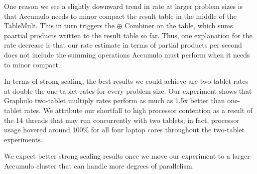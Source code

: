 One reason we see a slightly downward trend in rate at larger problem sizes is that Accumulo
needs to minor compact the result table in the middle of the TableMult. This in turn triggers 
the $\oplus$ Combiner on the table, which sums paartial products written to the result table so far.
Thus, one explanation for the rate decrease is that 
our rate estimate in terms of partial products per second does not include the summing operations
Accumulo must perform when it needs to minor compact.

In terms of strong scaling, the best results we could achieve are two-tablet rates
at double the one-tablet rates for every problem size.
Our experiment shows that Graphulo two-tablet multiply rates perform as much as 1.5x better
than one-tablet rates.  We attribute our shortfall to high processor contention as a result of 
the 14 threads that may run concurrently with two tablets; in fact,
processor usage hovered around 100\% for all four laptop cores throughout the two-tablet experiments.

We expect better strong scaling results once we move our experiment 
to a larger Accumulo cluster that can handle more degrees of parallelism.

